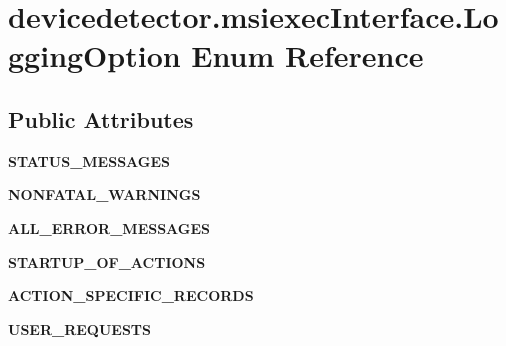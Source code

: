 \hypertarget{enumdevicedetector_1_1msiexecInterface_1_1LoggingOption}{\section{devicedetector.\-msiexec\-Interface.\-Logging\-Option Enum Reference}
\label{enumdevicedetector_1_1msiexecInterface_1_1LoggingOption}
}
\subsection*{Public Attributes}
\begin{DoxyCompactItemize}
\item 
\hypertarget{enumdevicedetector_1_1msiexecInterface_1_1LoggingOption_a41ea9a6010bb045bc27137d10ecc7d47}{{\bfseries S\-T\-A\-T\-U\-S\-\_\-\-M\-E\-S\-S\-A\-G\-E\-S}}\label{enumdevicedetector_1_1msiexecInterface_1_1LoggingOption_a41ea9a6010bb045bc27137d10ecc7d47}

\item 
\hypertarget{enumdevicedetector_1_1msiexecInterface_1_1LoggingOption_ae0786d1e19c2b3db2a57e21c81fb61e2}{{\bfseries N\-O\-N\-F\-A\-T\-A\-L\-\_\-\-W\-A\-R\-N\-I\-N\-G\-S}}\label{enumdevicedetector_1_1msiexecInterface_1_1LoggingOption_ae0786d1e19c2b3db2a57e21c81fb61e2}

\item 
\hypertarget{enumdevicedetector_1_1msiexecInterface_1_1LoggingOption_ab70c8946bb68ccd57b4dd8c04e7e1ce6}{{\bfseries A\-L\-L\-\_\-\-E\-R\-R\-O\-R\-\_\-\-M\-E\-S\-S\-A\-G\-E\-S}}\label{enumdevicedetector_1_1msiexecInterface_1_1LoggingOption_ab70c8946bb68ccd57b4dd8c04e7e1ce6}

\item 
\hypertarget{enumdevicedetector_1_1msiexecInterface_1_1LoggingOption_adde5ecd117b57c0840fd5b2967d69786}{{\bfseries S\-T\-A\-R\-T\-U\-P\-\_\-\-O\-F\-\_\-\-A\-C\-T\-I\-O\-N\-S}}\label{enumdevicedetector_1_1msiexecInterface_1_1LoggingOption_adde5ecd117b57c0840fd5b2967d69786}

\item 
\hypertarget{enumdevicedetector_1_1msiexecInterface_1_1LoggingOption_a3483a3bfe45475bd92754eae658a3459}{{\bfseries A\-C\-T\-I\-O\-N\-\_\-\-S\-P\-E\-C\-I\-F\-I\-C\-\_\-\-R\-E\-C\-O\-R\-D\-S}}\label{enumdevicedetector_1_1msiexecInterface_1_1LoggingOption_a3483a3bfe45475bd92754eae658a3459}

\item 
\hypertarget{enumdevicedetector_1_1msiexecInterface_1_1LoggingOption_ae3273365a210f3b2f6a5e0f44de22541}{{\bfseries U\-S\-E\-R\-\_\-\-R\-E\-Q\-U\-E\-S\-T\-S}}\label{enumdevicedetector_1_1msiexecInterface_1_1LoggingOption_ae3273365a210f3b2f6a5e0f44de22541}


\end{DoxyCompactItemize}
